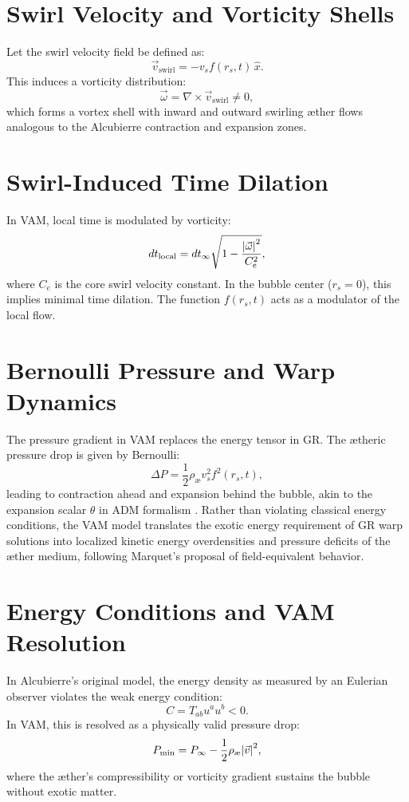 \documentclass[12pt]{article}
\begin{document}
\section{Swirl Velocity and Vorticity Shells}
Let the swirl velocity field be defined as:
\begin{equation}
    \vec{v}_{\text{swirl}} = -v_s f(r_s, t)\, \hat{x}.
\end{equation}
This induces a vorticity distribution:
\begin{equation}
    \vec{\omega} = \nabla \times \vec{v}_{\text{swirl}} \neq 0,
\end{equation}
which forms a vortex shell with inward and outward swirling æther flows analogous to the Alcubierre contraction and expansion zones.

\section{Swirl-Induced Time Dilation}
In VAM, local time is modulated by vorticity:
\begin{equation}
    dt_{\text{local}} = dt_{\infty} \sqrt{1 - \frac{\abs{\vec{\omega}}^2}{C_e^2}},
\end{equation}
where \( C_e \) is the core swirl velocity constant. In the bubble center (\( r_s = 0 \)), this implies minimal time dilation. The function \( f(r_s, t) \) acts as a modulator of the local flow.

\section{Bernoulli Pressure and Warp Dynamics}
The pressure gradient in VAM replaces the energy tensor in GR. The ætheric pressure drop is given by Bernoulli:
\begin{equation}
    \Delta P = \frac{1}{2} \rho_\text{\ae} v_s^2 f^2(r_s, t),
\end{equation}
leading to contraction ahead and expansion behind the bubble, akin to the expansion scalar \( \theta \) in ADM formalism \cite{marquet2009warp}.
Rather than violating classical energy conditions, the VAM model translates the exotic energy requirement of GR warp solutions into localized kinetic energy overdensities and pressure deficits of the æther medium, following Marquet's proposal of field-equivalent behavior.

\section{Energy Conditions and VAM Resolution}
In Alcubierre's original model, the energy density as measured by an Eulerian observer violates the weak energy condition:
\begin{equation}
    C = T_{ab} u^a u^b < 0.
\end{equation}
In VAM, this is resolved as a physically valid pressure drop:
\begin{equation}
    P_{\text{min}} = P_\infty - \frac{1}{2} \rho_\text{\ae} \abs{\vec{v}}^2,
\end{equation}
where the æther's compressibility or vorticity gradient sustains the bubble without exotic matter.
\end{document}
